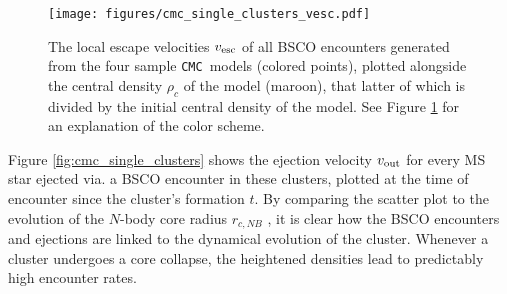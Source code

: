 \documentclass[twocolumn]{aastex631}
\newcommand{\CMC}{\texttt{CMC}}
\begin{document}
\begin{figure}
    \centering
    \texttt{[image: figures/cmc\_single\_clusters\_vesc.pdf]}
    \caption{
        The local escape velocities $v_{\rm esc}$ of all BSCO encounters generated from the four sample \CMC\ models (colored points), plotted alongside the central density $\rho_c$ of the model (maroon), that latter of which is divided by the initial central density of the model.
        See Figure \ref{fig:cmc_single_clusters_vesc} for an explanation of the color scheme.
    }
    \label{fig:cmc_single_clusters_vesc}
\end{figure}

Figure \ref{fig:cmc_single_clusters} shows the ejection velocity $v_{\rm out}$ for every MS star ejected via. a BSCO encounter in these clusters, plotted at the time of encounter since the cluster's formation $t$.
By comparing the scatter plot to the evolution of the $N$-body core radius $r_{c, NB}$ \citep{1985ApJ...298...80C}, it is clear how the BSCO encounters and ejections are linked to the dynamical evolution of the cluster.
Whenever a cluster undergoes a core collapse, the heightened densities lead to predictably high encounter rates.

\begin{figure*}
    \caption{
        Scatter plots of the cluster ejection velocity $V_{rm out}$ versus encounter time $t$ for every escaping object from the integrated encounters for the four sample \CMC\ models (see the beginning of \S\ref{subsec:single_clusters} for details).
        The histograms show the same data in 1D.
        The different types of encounters are color-coded: encounters between a binary star and a CO are in red,
        encounters between a mixed binary (1 star and 1 CO) and a CO are in blue, encounters between a mixed binary and a star are in yellow, and encounters between a CO binary and a star are in purple.
        The $N$-body core radius $r_{c, NB}$ \citep{1985ApJ...298...80C} of the model is plotted in maroon over the timewise histogram.
    }
    \label{fig:cmc_single_clusters}
\end{figure*}
\end{document}

